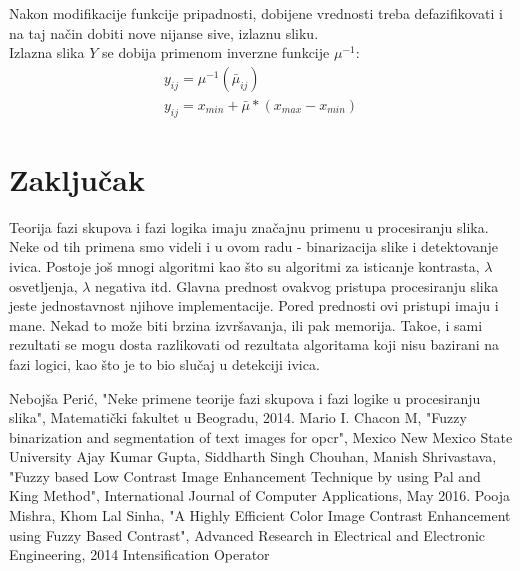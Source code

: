 \documentclass[12pt,a4paper]{article}
\theoremstyle{definition}
\theoremstyle{remark}
\theoremstyle{plain}
\begin{document}
Nakon modifikacije funkcije pripadnosti, dobijene vrednosti treba defazifikovati i na taj na\v cin dobiti nove nijanse sive, izlaznu sliku.\\
Izlazna slika $Y$ se dobija primenom inverzne funkcije $\mu^{-1}$:\\
\begin{align*}
  y_{ij} = \mu^{-1}(\bar\mu_{ij})\\
  y_{ij} = x_{min} + \bar\mu * (x_{max} - x_{min})
\end{align*}

















\section{Zaklju\v cak}
Teorija fazi skupova i fazi logika imaju zna\v cajnu primenu u procesiranju slika. Neke od tih primena smo videli i u ovom radu - binarizacija slike i detektovanje ivica. Postoje jo\v s mnogi algoritmi kao \v sto su algoritmi za isticanje kontrasta, $\lambda$ osvetljenja, $\lambda$ negativa itd.  Glavna prednost ovakvog pristupa procesiranju slika jeste jednostavnost njihove implementacije. Pored prednosti ovi pristupi imaju i mane. Nekad to mo\v ze biti brzina izvr\v savanja, ili pak memorija. Tako\dj e, i sami rezultati se mogu dosta razlikovati od rezultata algoritama koji nisu bazirani na fazi logici, kao \v sto je to bio slu\v caj u detekciji ivica.

\begin{thebibliography}{9}
  \bibitem{} Neboj\v sa Peri\' c, "Neke primene teorije fazi skupova i fazi logike u procesiranju slika", Matemati\v cki fakultet u Beogradu, 2014.
  \bibitem{} Mario I. Chacon M, "Fuzzy binarization and segmentation of text images for opcr", Mexico New Mexico State University
  \bibitem{} Ajay Kumar Gupta, Siddharth Singh Chouhan, Manish Shrivastava, "Fuzzy based Low Contrast Image Enhancement Technique by using Pal and King Method", International Journal of Computer Applications, May 2016.
  \bibitem{} Pooja Mishra, Khom Lal Sinha, "A Highly Efficient Color Image Contrast Enhancement using Fuzzy Based Contrast", Advanced Research in Electrical and Electronic Engineering, 2014
Intensification Operator

\end{thebibliography}
\end{document}
